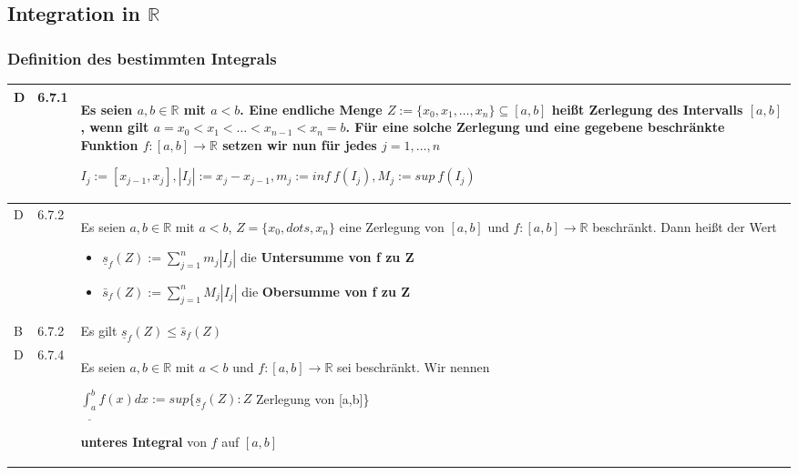 \pagebreak

\subsection{Integration in $\mathbb{R}$}
\subsubsection{Definition des bestimmten Integrals}

    \begin{longtable}{p{0.75cm} p{1cm} p{16cm}}
        \toprule

        D   & 6.7.1 &   Es seien $a,b \in \mathbb{R}$ mit $a < b$. Eine endliche Menge $Z:= \{ x_0, x_1, \dots, x_n \} \subseteq [a,b]$ heißt
                        \textbf{Zerlegung} des Intervalls $[a,b]$, wenn gilt $a = x_0 < x_1 < \dots < x_{n-1} < x_n = b$. \hfill \break
                        Für eine solche Zerlegung und eine gegebene beschränkte Funktion $f: [a,b] \rightarrow \mathbb{R}$ setzen wir nun
                        für jedes $j = 1,\dots,n$ \hfill \break
                        \centerline{$ I_j := [x_{j-1},x_j], |I_j| := x_j - x_{j-1}, m_j := inf~f(I_j), M_j := sup~f(I_j)$} \\
        \midrule
        D   & 6.7.2 &   Es seien $a,b \in \mathbb{R}$ mit $a < b$, $Z = \{ x_0, dots, x_n\}$ eine Zerlegung von $[a,b]$ und $f:[a,b]\rightarrow \mathbb{R}$
                        beschränkt. Dann heißt der Wert 
                        \begin{itemize}[topsep=-0.5cm]
                            \item[] $\underline{s}_f(Z) := \sum^{n}_{j=1} m_j |I_j|$ die \textbf{Untersumme von f zu Z}
                            \item[] $\bar{s}_f(Z) := \sum^{n}_{j=1} M_j |I_j|$ die \textbf{Obersumme von f zu Z}
                        \end{itemize} \vspace{-0cm} \\
        \midrule
        B   & 6.7.2 &   Es gilt $\underline{s}_f(Z) \leq \bar{s}_f(Z)$\\
        \midrule
        D   & 6.7.4 &   Es seien $a, b \in \mathbb{R}$ mit $ a < b$ und $f: [a,b] \rightarrow \mathbb{R}$ sei beschränkt. \hfill \break
                        Wir nennen \hfill \break
                        \centerline{$ \underline{\int_a^b} f(x) dx:= sup\{ \underline{s}_f(Z):Z$ Zerlegung von [a,b]\}}
                        \textbf{unteres Integral} von $f$ auf $[a,b]$ \hfill \break

\end{longtable}
